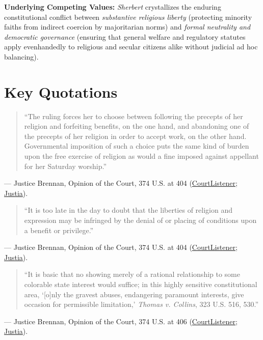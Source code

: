 \documentclass[12pt]{article}
\begin{document}
\textbf{Underlying Competing Values:} \textit{Sherbert} crystallizes the enduring constitutional conflict between \textit{substantive religious liberty} (protecting minority faiths from indirect coercion by majoritarian norms) and \textit{formal neutrality and democratic governance} (ensuring that general welfare and regulatory statutes apply evenhandedly to religious and secular citizens alike without judicial ad hoc balancing).

\section{Key Quotations}

\begin{quote}
``The ruling forces her to choose between following the precepts of her religion and forfeiting benefits, on the one hand, and abandoning one of the precepts of her religion in order to accept work, on the other hand. Governmental imposition of such a choice puts the same kind of burden upon the free exercise of religion as would a fine imposed against appellant for her Saturday worship.''
\end{quote}
\noindent --- Justice Brennan, Opinion of the Court, 374 U.S. at 404 (\href{https://www.courtlistener.com/opinion/106660/sherbert-v-verner/}{CourtListener}; \href{https://supreme.justia.com/cases/federal/us/374/398/}{Justia}).

\begin{quote}
``It is too late in the day to doubt that the liberties of religion and expression may be infringed by the denial of or placing of conditions upon a benefit or privilege.''
\end{quote}
\noindent --- Justice Brennan, Opinion of the Court, 374 U.S. at 404 (\href{https://www.courtlistener.com/opinion/106660/sherbert-v-verner/}{CourtListener}; \href{https://supreme.justia.com/cases/federal/us/374/398/}{Justia}).

\begin{quote}
``It is basic that no showing merely of a rational relationship to some colorable state interest would suffice; in this highly sensitive constitutional area, `[o]nly the gravest abuses, endangering paramount interests, give occasion for permissible limitation,' \textit{Thomas v. Collins}, 323 U.S. 516, 530.''
\end{quote}
\noindent --- Justice Brennan, Opinion of the Court, 374 U.S. at 406 (\href{https://www.courtlistener.com/opinion/106660/sherbert-v-verner/}{CourtListener}; \href{https://supreme.justia.com/cases/federal/us/374/398/}{Justia}).
\end{document}
